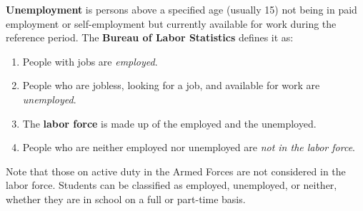 \documentclass{article}
\begin{document}
    \begin{definition}[Unemployment]
      \textbf{Unemployment} is persons above a specified age (usually 15) not being in paid employment or self-employment but currently available for work during the reference period. The \textbf{Bureau of Labor Statistics} defines it as: 
      \begin{enumerate}
        \item People with jobs are \textit{employed}. 
        \item People who are jobless, looking for a job, and available for work are \textit{unemployed}. 
        \item The \textbf{labor force} is made up of the employed and the unemployed. 
        \item People who are neither employed nor unemployed are \textit{not in the labor force}. 
      \end{enumerate}
      Note that those on active duty in the Armed Forces are not considered in the labor force. Students can be classified as employed, unemployed, or neither, whether they are in school on a full or part-time basis. 
    \end{definition}
\end{document}
